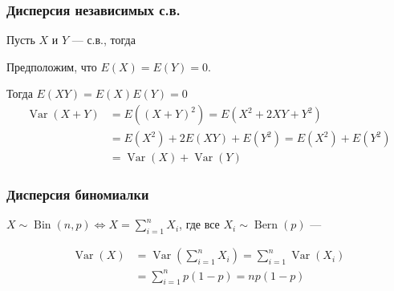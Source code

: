 \documentclass[hyperref=unicode,graphics=pdflatex,13pt,xcolor={usenames,dvipsnames}]{beamer}
\renewcommand\emph[1]{{\color{blue}{#1}}}
\DeclareMathOperator{\Bin}{Bin}
\DeclareMathOperator{\Bern}{Bern}
\DeclareMathOperator{\Var}{Var}
\begin{document}
\begin{frame}
  \frametitle{Дисперсия независимых с.в.}

  Пусть $X$ и $Y$ --- \emph{независимые} с.в., тогда 
  \begin{center}
  \end{center}

  \pause
  Предположим, что $E(X) = E(Y) = 0$.
  
  Тогда $E(XY) = E(X)E(Y) = 0$
  \pause
  \begin{align*}
    \Var(X + Y) &= E\left((X + Y)^2\right) = E\left(X^2 + 2XY + Y^2\right) \\
                &= E(X^2) + 2 E(XY) + E(Y^2) = E(X^2) + E(Y^2) \\
                &= \Var(X) + \Var(Y)
  \end{align*}
\end{frame}

\begin{frame}
  \frametitle{Дисперсия биномиалки}
  \emph{Напоминание:} $X \sim \Bin(n, p) \Leftrightarrow X = \sum_{i = 1}^n X_i$, где все $X_i \sim \Bern(p)$ --- \emph{независимы}

  \begin{align*}
    \Var(X) &= \Var\left(\sum_{i = 1}^n X_i\right) = \sum_{i = 1}^n \Var(X_i) \\
            &= \sum_{i = 1}^n p(1 - p) = np(1 - p)
  \end{align*}
\end{frame}
\end{document}
